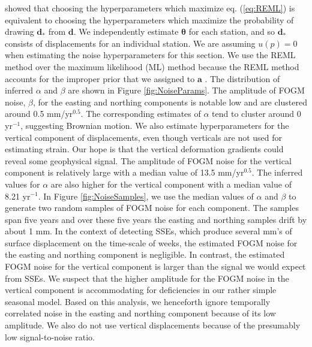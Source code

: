 \documentclass[10pt,letter]{article}
\begin{document}
\citet{Harville1974} showed that choosing the hyperparameters which maximize eq. (\ref{eq:REML}) is equivalent to choosing the hyperparameters which maximize the probability of drawing $\bm{d}_*$ from $\bm{d}$. We independently estimate $\bm{\theta}$ for each station, and so $\bm{d}_*$ consists of displacements for an individual station. We are assuming $u(p)=0$ when estimating the noise hyperparameters for this section. We use the REML method over the maximum likelihood (ML) method \citep[e.g.,][]{Langbein1997} because the REML method accounts for the improper prior that we assigned to $\bm{a}$ \citep{Hines2017}. The distribution of inferred $\alpha$ and $\beta$ are shown in Figure \ref{fig:NoiseParams}. The amplitude of FOGM noise, $\beta$, for the easting and northing components is notable low and are clustered around 0.5 mm/yr$^{0.5}$. The corresponding estimates of $\alpha$ tend to cluster around 0 yr$^{-1}$, suggesting Brownian motion. We also estimate hyperparameters for the vertical component of displacements, even though verticals are not used for estimating strain. Our hope is that the vertical deformation gradients could reveal some geophysical signal. The amplitude of FOGM noise for the vertical component is relatively large with a median value of 13.5 mm/yr$^{0.5}$.  The inferred values for $\alpha$ are also higher for the vertical component with a median value of 8.21 yr$^{-1}$. In Figure \ref{fig:NoiseSamples}, we use the median values of $\alpha$ and $\beta$ to generate two random samples of FOGM noise for each component. The samples span five years and over these five years the easting and northing samples drift by about 1 mm. In the context of detecting SSEs, which produce several mm's of surface displacement on the time-scale of weeks, the estimated FOGM noise for the easting and northing component is negligible. In contrast, the estimated FOGM noise for the vertical component is larger than the signal we would expect from SSEs. We suspect that the higher amplitude for the FOGM noise in the vertical component is accommodating for deficiencies in our rather simple seasonal model. Based on this analysis, we henceforth ignore temporally correlated noise in the easting and northing component because of its low amplitude. We also do not use vertical displacements because of the presumably low signal-to-noise ratio.
\end{document}
